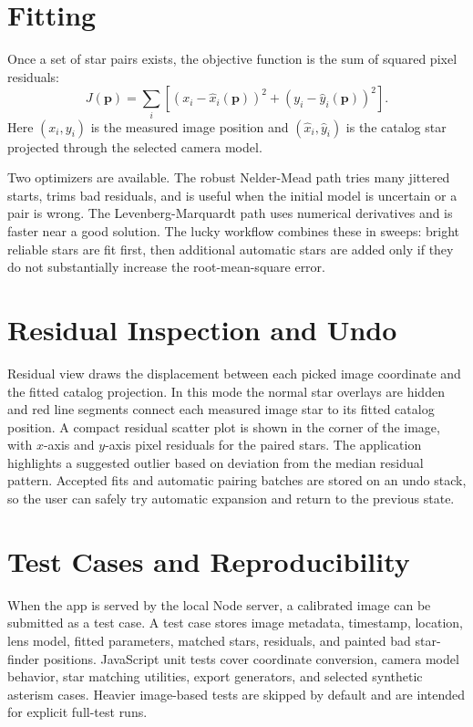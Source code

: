 \documentclass[11pt]{article}
\begin{document}
\section{Fitting}

Once a set of star pairs exists, the objective function is the sum of squared
pixel residuals:
\begin{equation}
  J(\mathbf{p}) = \sum_i
  \left[
    \left(x_i - \hat{x}_i(\mathbf{p})\right)^2
    +
    \left(y_i - \hat{y}_i(\mathbf{p})\right)^2
  \right].
\end{equation}
Here \((x_i,y_i)\) is the measured image position and
\((\hat{x}_i,\hat{y}_i)\) is the catalog star projected through the selected
camera model.

Two optimizers are available. The robust Nelder-Mead path tries many jittered
starts, trims bad residuals, and is useful when the initial model is uncertain
or a pair is wrong. The Levenberg-Marquardt path uses numerical derivatives and
is faster near a good solution. The lucky workflow combines these in sweeps:
bright reliable stars are fit first, then additional automatic stars are added
only if they do not substantially increase the root-mean-square error.

\section{Residual Inspection and Undo}

Residual view draws the displacement between each picked image coordinate and
the fitted catalog projection. In this mode the normal star overlays are hidden
and red line segments connect each measured image star to its fitted catalog
position. A compact residual scatter plot is shown in the corner of the image,
with \(x\)-axis and \(y\)-axis pixel residuals for the paired stars. The
application highlights a suggested outlier based on deviation from the median
residual pattern. Accepted fits and automatic pairing batches are stored on an
undo stack, so the user can safely try automatic expansion and return to the
previous state.

\section{Test Cases and Reproducibility}

When the app is served by the local Node server, a calibrated image can be
submitted as a test case. A test case stores image metadata, timestamp,
location, lens model, fitted parameters, matched stars, residuals, and
painted bad star-finder positions. JavaScript unit tests cover coordinate
conversion, camera model behavior, star matching utilities, export generators,
and selected synthetic asterism cases. Heavier image-based tests are skipped by
default and are intended for explicit full-test runs.
\end{document}
